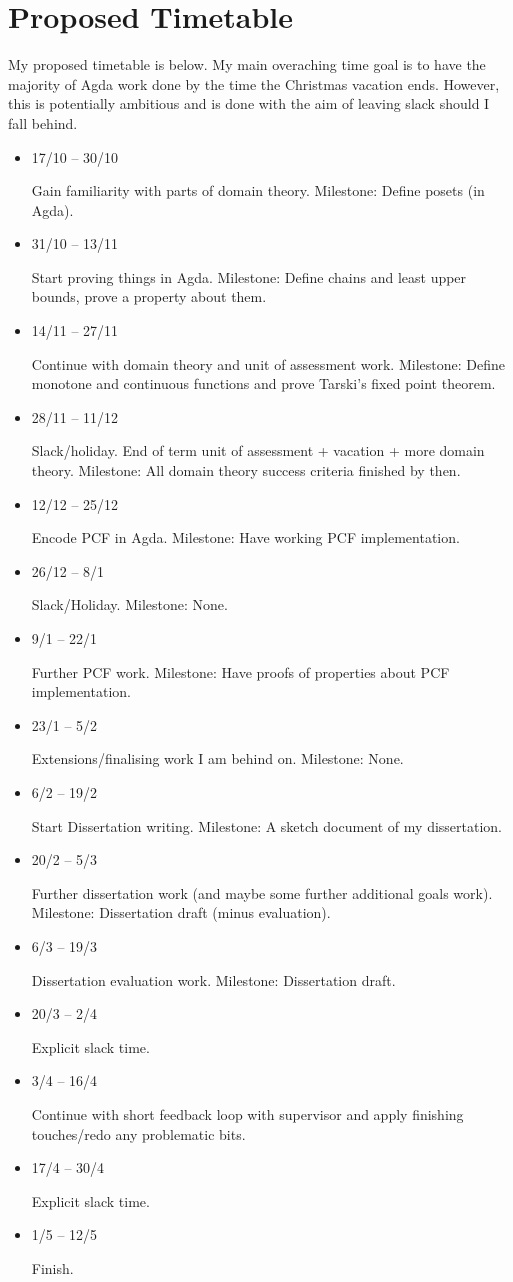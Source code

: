 \documentclass{article}
\begin{document}
\section{Proposed Timetable}
My proposed timetable is below. My main overaching time goal is to have the majority of Agda work done by the time the Christmas vacation ends. However, this is potentially ambitious and is done with the aim of leaving slack should I fall behind. 
\begin{itemize}
\item 17/10 -- 30/10

Gain familiarity with parts of domain theory. Milestone: Define posets (in Agda).
\item 31/10 -- 13/11

Start proving things in Agda. Milestone: Define chains and least upper bounds, prove a property about them. 
\item 14/11 -- 27/11

Continue with domain theory and unit of assessment work. Milestone: Define monotone and continuous functions and prove Tarski's fixed point theorem.
\item 28/11 -- 11/12

Slack/holiday. End of term unit of assessment + vacation + more domain theory. Milestone: All domain theory success criteria finished by then.
\item 12/12 -- 25/12

Encode PCF in Agda. Milestone: Have working PCF implementation.
\item 26/12 -- 8/1

Slack/Holiday. Milestone: None.
\item 9/1 -- 22/1

Further PCF work. Milestone: Have proofs of properties about PCF implementation.
\item 23/1 -- 5/2

Extensions/finalising work I am behind on. Milestone: None. 
\item 6/2 -- 19/2

Start Dissertation writing. Milestone: A sketch document of my dissertation.
\item 20/2 -- 5/3

Further dissertation work (and maybe some further additional goals work). Milestone: Dissertation draft (minus evaluation).
\item 6/3 -- 19/3

Dissertation evaluation work. Milestone: Dissertation draft. 
\item 20/3 -- 2/4

Explicit slack time.
\item 3/4 -- 16/4

Continue with short feedback loop with supervisor and apply finishing touches/redo any problematic bits.
\item 17/4 -- 30/4

Explicit slack time. 
\item 1/5 -- 12/5

Finish. 
\end{itemize}
\end{document}
